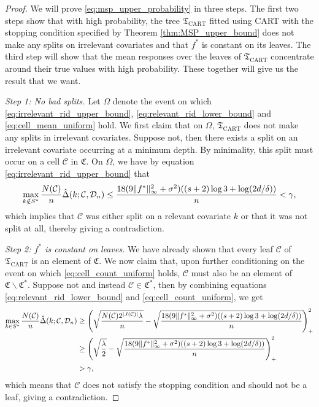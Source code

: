 \documentclass[11pt]{article}
\DeclarePairedDelimiter{\paren}{(}{)}
\DeclarePairedDelimiter{\norm}{\|}{\|}
\newcommand{\tree}{\mathfrak{T}}
\newcommand{\cell}{\mathcal{C}}
\newcommand{\nfeats}{d}
\newcommand{\data}[1][n]{\mathcal{D}_{#1}}
\newcommand{\cellfeatindices}{J}
\newcommand{\suppset}{S^*}
\newcommand{\event}{\Omega}
\newcommand{\cellcollection}{{\mathfrak{C}^*}}
\newcommand{\secondcellcollection}{\mathfrak{C}}
\begin{document}
\begin{proof}
    We will prove \eqref{eq:msp_upper_probability} in three steps.
    The first two steps show that with high probability, the tree $\tree_{\operatorname{CART}}$ fitted using CART with the stopping condition specified by Theorem \ref{thm:MSP_upper_bound} does not make any splits on irrelevant covariates and that $f^*$ is constant on its leaves.
    The third step will show that the mean responses over the leaves of $\tree_{\operatorname{CART}}$ concentrate around their true values with high probability.
    These together will give us the result that we want.
    
    \textit{Step 1: No bad splits.}
    Let $\event$ denote the event on which \eqref{eq:irrelevant_rid_upper_bound}, \eqref{eq:relevant_rid_lower_bound} and \eqref{eq:cell_mean_uniform} hold.
    We first claim that on $\event$, $\tree_{\operatorname{CART}}$ does not make any splits in irrelevant covariates.
    Suppose not, then there exists a split on an irrelevant covariate occurring at a minimum depth.
    By minimality, this split must occur on a cell $\cell$ in $\secondcellcollection$.
    On $\event$, we have by equation \eqref{eq:irrelevant_rid_upper_bound} that
    \begin{equation}
        \label{eq:no_bad_splits}
        \max_{k \notin \suppset} \frac{N(\cell)}{n}\hat\Delta(k;\cell,\data) \leq \frac{18(9\norm{f^*}_\infty^2 + \sigma^2)\paren*{(s+2)\log 3 + \log(2\nfeats/\delta)}}{n} < \gamma,
    \end{equation}
    which implies that $\cell$ was either split on a relevant covariate $k$ or that it was not split at all, thereby giving a contradiction.

    \textit{Step 2: $f^*$ is constant on leaves.}
    We have already shown that every leaf $\cell$ of $\tree_{\operatorname{CART}}$ is an element of $\secondcellcollection$.
    We now claim that, upon further conditioning on the event on which \eqref{eq:cell_count_uniform} holds, $\cell$ must also be an element of $\secondcellcollection\backslash \cellcollection$.
    Suppose not and instead $\cell \in \cellcollection$, then by combining equations \eqref{eq:relevant_rid_lower_bound} and \eqref{eq:cell_count_uniform}, we get
    \begin{equation}
        \begin{split}
            \max_{k \in \suppset} \frac{N(\cell)}{n}\hat\Delta(k;\cell,\data) & \geq \paren*{\sqrt{\frac{N(\cell)2^{|\cellfeatindices(\cell)|}\lambda}{n}} - \sqrt{\frac{18(9\norm{f^*}_\infty^2 + \sigma^2)\paren*{(s+2)\log 3 + \log(2\nfeats/\delta)}}{n}}}_+^2 \\
            & \geq \paren*{\sqrt{\frac{\lambda}{2}} - \sqrt{\frac{18(9\norm{f^*}_\infty^2 + \sigma^2)\paren*{(s+2)\log 3 + \log(2\nfeats/\delta)}}{n}}}_+^2 \\
            & > \gamma,
        \end{split}
    \end{equation}
    which means that $\cell$ does not satisfy the stopping condition and should not be a leaf, giving a contradiction.
    

\end{proof}
\end{document}
